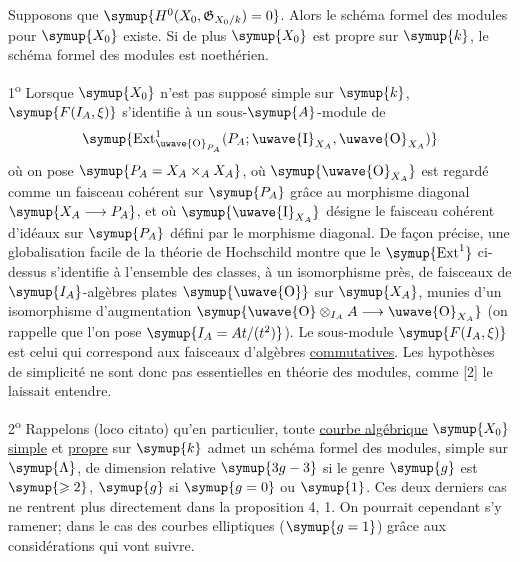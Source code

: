  Supposons que
$\symup{H^0(X_0,\mathfrak G_{X_0/k})=0}$. Alors le schéma formel des modules pour $\symup{X_0}$
existe. Si de plus $\symup{X_0}$ est propre sur $\symup{k}$, le schéma formel des modules est
noethérien.


1\textsuperscript{o} Lorsque $\symup{X_0}$ n'est pas supposé
simple sur $\symup{k}$, $\symup{F(I_A,\xi)}$ s'identifie à un sous-$\symup{A}$-module de
\[
  \symup{\operatorname{Ext}^1_{\text{\uwave{O}}_{P_A}}(P_A;\text{\uwave{I}}_{X_A},\text{\uwave{O}}_{X_A})}
\]
où on pose $\symup{P_A=X_A\times_A X_A}$, où $\symup{\text{\uwave{O}}_{X_A}}$ est regardé
comme un faisceau cohérent sur $\symup{P_A}$ grâce au morphisme diagonal
$\symup{X_A\longrightarrow P_A}$, et où $\symup{\text{\uwave{I}}_{X_A}}$ désigne le faisceau
cohérent d'idéaux sur $\symup{P_A}$ défini par le morphisme diagonal. De façon précise,
une globalisation facile de la théorie de Hochschild montre que le
$\symup{\operatorname{Ext}^1}$ ci-dessus s'identifie à l'ensemble des classes, à un
isomorphisme près, de faisceaux de $\symup{I_A}$-algèbres plates $\symup{\text{\uwave{O}}}$ sur
$\symup{X_A}$, munies d'un isomorphisme d'augmentation $\symup{\text{\uwave{O}}\otimes_{I_A}A\longrightarrow\text{\uwave{O}}_{X_A}}$ (on rappelle que l'on pose $\symup{I_A=At/(t^2)}$). Le sous-module $\symup{F(I_A,\xi)}$ est
celui qui correspond aux faisceaux d'algèbres \uline{commutatives}. Les hypothèses de
simplicité ne sont donc pas essentielles en théorie des modules, comme [2] le
laissait entendre.

2\textsuperscript{o} Rappelons (loco citato) qu'en particulier, toute \uline{courbe
algébrique} $\symup{X_0}$ \uline{simple} et \uline{propre} sur $\symup{k}$ admet un schéma formel des modules,
simple sur $\symup{\Lambda}$, de dimension relative $\symup{3g-3}$ si le genre $\symup{g}$ est
$\symup{\geqslant2}$, $\symup{g}$ si $\symup{g=0}$ ou $\symup{1}$. Ces deux derniers cas ne rentrent plus
directement dans la proposition 4, 1. On pourrait cependant s'y ramener; dans
le cas des courbes elliptiques ($\symup{g=1}$) grâce aux considérations qui vont
suivre.

